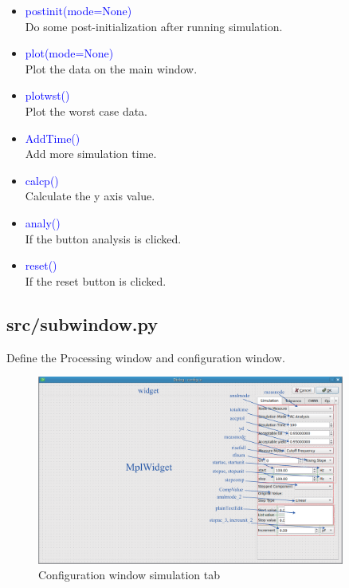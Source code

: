 \documentclass[12pt,a4paper]{article}
\begin{document}
\begin{itemize}[leftmargin=*]
\begin{itemize}
    \item \textcolor{blue}{postinit(mode=None)}\\
        Do some post-initialization after running simulation.

    \item \textcolor{blue}{plot(mode=None)}\\
        Plot the data on the main window.

    \item \textcolor{blue}{plotwst()}\\
        Plot the worst case data.

    \item \textcolor{blue}{AddTime()}\\
        Add more simulation time.

    \item \textcolor{blue}{calcp()}\\
        Calculate the y axis value.

    \item \textcolor{blue}{analy()}\\
        If the button analysis is clicked.

    \item \textcolor{blue}{reset()}\\
        If the reset button is clicked.

\end{itemize}

\subsection{src/\textunderscore subwindow.py}
Define the Processing window and configuration window.

\begin{figure}[ht]
    \centering
    \includegraphics[width=0.9\textwidth]{Image/config.eps}
    \caption{Configuration window simulation tab}
\end{figure}


\end{itemize}
\end{document}
